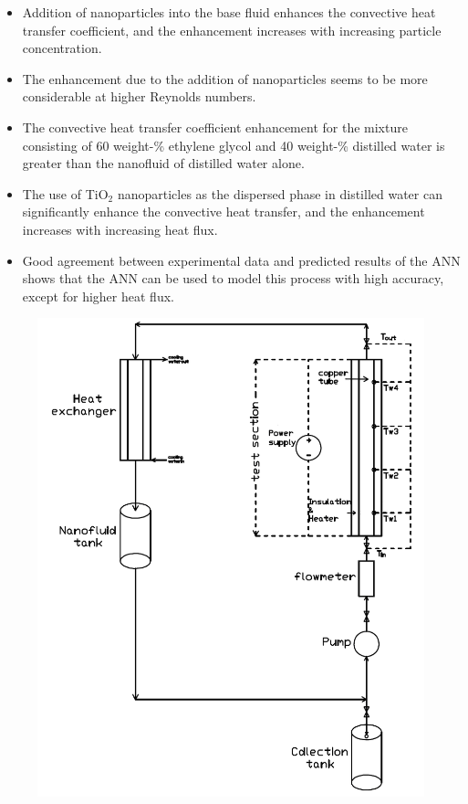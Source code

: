 \documentclass{article}
\begin{document}
\begin{itemize}
	\item Addition of nanoparticles into the base fluid enhances the convective heat transfer coefficient, and the enhancement increases with increasing particle concentration.
	\item The enhancement due to the addition of nanoparticles seems to be more considerable at higher Reynolds numbers.
	\item The convective heat transfer coefficient enhancement for the mixture consisting of 60 weight-\% ethylene glycol and 40 weight-\% distilled water is greater than the nanofluid of distilled water alone.
	\item The use of TiO$_2$ nanoparticles as the dispersed phase in distilled water can significantly enhance the convective heat transfer, and the enhancement increases with increasing heat flux.
	\item Good agreement between experimental data and predicted results of the ANN shows that the ANN can be used to model this process with high accuracy, except for higher heat flux.
\end{itemize}



\appendix

\begin{figure}
	\centering
	\includegraphics[width=0.9\linewidth]{fig1}
	\caption{}
	\label{fig:fig1}
\end{figure}
\end{document}
